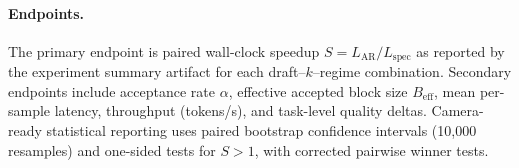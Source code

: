 \paragraph{Endpoints.}
The primary endpoint is paired wall-clock speedup
$S = L_{\text{AR}}/L_{\text{spec}}$ as reported by the experiment summary
artifact for each draft--$k$--regime combination.
Secondary endpoints include acceptance rate $\alpha$, effective accepted block
size $B_{\text{eff}}$, mean per-sample latency, throughput (tokens/s), and
task-level quality deltas. Camera-ready statistical reporting uses paired
bootstrap confidence intervals (10{,}000 resamples) and one-sided tests for
$S{>}1$, with corrected pairwise winner tests.
